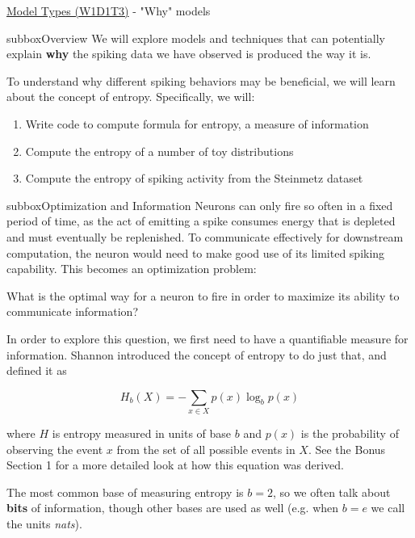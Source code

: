 \begin{textbox}{\href{https://compneuro.neuromatch.io/tutorials/W1D1_ModelTypes/student/W1D1_Tutorial3.html}{Model Types (W1D1T3)} -  "Why" models}

\begin{subbox}{subbox}{Overview}
\scriptsize
We will explore models and techniques that can potentially explain \textbf{why} the spiking data we have observed is produced the way it is.

To understand why different spiking behaviors may be beneficial, we will learn about the concept of entropy. Specifically, we will:

\begin{enumerate}
    \item  Write code to compute formula for entropy, a measure of information
 \item  Compute the entropy of a number of toy distributions
 \item  Compute the entropy of spiking activity from the Steinmetz dataset

\end{enumerate}
\end{subbox}
\begin{subbox}{subbox}{Optimization and Information}
\scriptsize
Neurons can only fire so often in a fixed period of time, as the act of emitting a spike consumes energy that is depleted and must eventually be replenished. To communicate effectively for downstream computation, the neuron would need to make good use of its limited spiking capability. This becomes an optimization problem: 

What is the optimal way for a neuron to fire in order to maximize its ability to communicate information?

In order to explore this question, we first need to have a quantifiable measure for information. Shannon introduced the concept of entropy to do just that, and defined it as

\begin{equation}
H_b(X) = -\sum_{x\in X} p(x) \log_b p(x)
\end{equation}

where $H$ is entropy measured in units of base $b$ and $p(x)$ is the probability of observing the event $x$ from the set of all possible events in $X$. See the Bonus Section 1 for a more detailed look at how this equation was derived.

The most common base of measuring entropy is $b=2$, so we often talk about \textbf{bits} of information, though other bases are used as well (e.g. when $b=e$ we call the units \textit{nats}).


\end{subbox}
\end{textbox}
